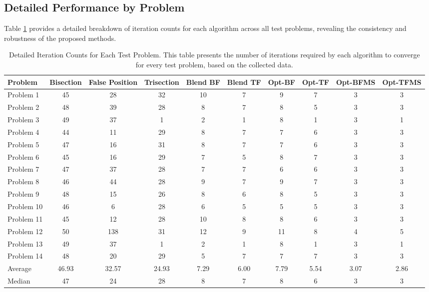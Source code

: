\documentclass[amsmath, amssymb, aps]{revtex4-2}
\begin{document}
\subsection{Detailed Performance by Problem}

Table \ref{tab:detailed_results} provides a detailed breakdown of iteration counts for each algorithm across all test problems, revealing the consistency and robustness of the proposed methods.

\begin{table}[H]
\centering
\caption{Detailed Iteration Counts for Each Test Problem. This table presents the number of iterations required by each algorithm to converge for every test problem, based on the collected data.}
\label{tab:detailed_results}
\begin{tabular}{lccccccccc}
\toprule
Problem & Bisection & False Position & Trisection & Blend BF & Blend TF & Opt-BF & Opt-TF & Opt-BFMS & Opt-TFMS \\
\midrule
Problem 1  & 45 & 28 & 32 & 10 & 7 & 9 & 7 & 3 & 3 \\
Problem 2  & 48 & 39 & 28 & 8  & 7 & 8 & 5 & 3 & 3 \\
Problem 3  & 49 & 37 & 1  & 2  & 1 & 8 & 1 & 3 & 1 \\
Problem 4  & 44 & 11 & 29 & 8  & 7 & 7 & 6 & 3 & 3 \\
Problem 5  & 47 & 16 & 31 & 8  & 7 & 7 & 6 & 3 & 3 \\
Problem 6  & 45 & 16 & 29 & 7  & 5 & 8 & 7 & 3 & 3 \\
Problem 7  & 47 & 37 & 28 & 7  & 7 & 6 & 6 & 3 & 3 \\
Problem 8  & 46 & 44 & 28 & 9  & 7 & 9 & 7 & 3 & 3 \\
Problem 9  & 48 & 15 & 26 & 8  & 6 & 8 & 5 & 3 & 3 \\
Problem 10 & 46 & 6  & 28 & 6  & 5 & 5 & 5 & 3 & 3 \\
Problem 11 & 45 & 12 & 28 & 10 & 8 & 8 & 6 & 3 & 3 \\
Problem 12 & 50 & 138& 31 & 12 & 9 & 11& 8 & 4 & 5 \\
Problem 13 & 49 & 37 & 1  & 2  & 1 & 8 & 1 & 3 & 1 \\
Problem 14 & 48 & 20 & 29 & 5  & 7 & 7 & 7 & 3 & 3 \\
\midrule
Average   & 46.93 & 32.57 & 24.93 & 7.29 & 6.00 & 7.79 & 5.54 & 3.07 & 2.86 \\
Median    & 47    & 24    & 28    & 8    & 7    & 8    & 6    & 3    & 3    \\
\bottomrule
\end{tabular}
\end{table}
\end{document}
